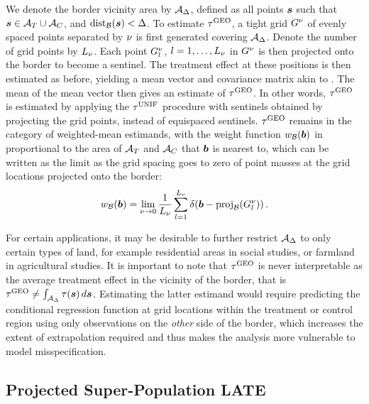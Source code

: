     We denote the border vicinity area by \(\mathcal{A}_\Delta\), defined as all points \(\bm{s}\) such that \(\bm{s} \in {\mathcal{A}_T\cup \mathcal{A}_C}\), and \(\dist_{\border}\del{\svec} < \buffer\).
To estimate \(\tau^{\mathrm{GEO}}\), a tight grid \(G^\nu\) of evenly spaced points separated by \(\nu\) is first generated covering \(\mathcal{A}_\Delta\).
Denote the number of grid points by \(L_\nu\).
Each point \(G^\nu_l\), \(l=1,\dotsc,L_\nu\) in \(G^\nu\) is then projected onto the border to become a sentinel.
The treatment effect at these positions is then estimated as before, yielding a mean vector and covariance matrix akin to .
The mean of the mean vector then gives an estimate of \(\tau^{\mathrm{GEO}}\).
In other words, \(\tau^{\mathrm{GEO}}\) is estimated by applying the \(\tau^{\mathrm{UNIF}}\) procedure with sentinels obtained by projecting the grid points, instead of equispaced sentinels.
\(\tau^{\mathrm{GEO}}\) remains in the category of weighted-mean estimands, with the weight function \(w_{\mathcal{B}}(\bm{b})\) in  proportional to the area of \(\mathcal{A}{}_{T}\) and \(\mathcal{A}{}_{C}\) that \(\bm{b}\) is nearest to, which can be written as the limit as the grid spacing goes to zero of point masses at the grid locations projected onto the border:
\begin{equation}
    \weightb(\sentinel) = \lim_{\gridres \rightarrow 0}\frac{1}{L_\gridres}\sum_{l=1}^{L_\gridres} \delta\del{\sentinel - \proj_{\border}\del{\grid_l} }\,.
\end{equation}

    For certain applications, it may be desirable to further restrict \(\mathcal{A}_\Delta\) to only certain types of land, for example residential areas in social studies, or farmland in agricultural studies.
It is important to note that \(\tau^{\mathrm{GEO}}\) is never interpretable as the average treatment effect in the vicinity of the border, that is \(\tau^{\mathrm{GEO}} \neq \int_{\mathcal{A}_\Delta} \tau(\bm{s}) \mathop{d \bm{s}}\).
Estimating the latter estimand would require predicting the conditional regression function at grid locations within the treatment or control region using only observations on the \emph{other} side of the border, which increases the extent of extrapolation required and thus makes the analysis more vulnerable to model misspecification.

\subsection{Projected Super-Population LATE}

